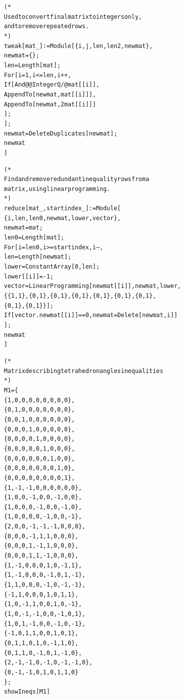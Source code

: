 \documentclass[a4paper, twoside]{article}
\begin{document}
{\begin{alltt}
(* 
  Used to convert final matrix to integers only,
  and to remove repeated rows.
*)
tweak[mat_] := Module[ \{i, j, len, len2, newmat\} , 
  newmat = \{\}; 
  len = Length[mat]; 
  For[i=1, i<=len, i++,
    If[And @@ IntegerQ /@ mat[[i]], 
      AppendTo[newmat, mat[[i]]], 
      AppendTo[newmat, 2 mat[[i]] ]
    ]; 
  ];
  newmat = DeleteDuplicates[newmat]; 
  newmat
]

(*
  Find and remove redundant inequality rows from a 
  matrix, using linear programming.
*)
reduce[mat_, startindex_] := Module[ 
  \{i, len, len0, newmat, lower, vector\}, 
  newmat = mat;
  len0 = Length[mat];   
  For[ i = len0, i >= startindex, i--, 
    len = Length[newmat]; 
    lower = ConstantArray[0, len];
    lower[[i]]= -1;
    vector = LinearProgramming[newmat[[i]], newmat, lower, 
      \{\{1,1\}, \{0,1\}, \{0,1\}, \{0,1\}, \{0,1\}, \{0,1\}, \{0,1\},
      \{0,1\}, \{0,1\}\}];
    If[vector. newmat[[i]] == 0, newmat = Delete[newmat,i]]
  ];
  newmat
]

(* 
  Matrix describing tetrahedron angles inequalities
*)
M1 = \{
  \{  1,  0,  0,  0,  0,  0,  0,  0,  0 \}, 
  \{  0,  1,  0,  0,  0,  0,  0,  0,  0 \}, 
  \{  0,  0,  1,  0,  0,  0,  0,  0,  0 \}, 
  \{  0,  0,  0,  1,  0,  0,  0,  0,  0 \}, 
  \{  0,  0,  0,  0,  1,  0,  0,  0,  0 \}, 
  \{  0,  0,  0,  0,  0,  1,  0,  0,  0 \}, 
  \{  0,  0,  0,  0,  0,  0,  1,  0,  0 \}, 
  \{  0,  0,  0,  0,  0,  0,  0,  1,  0 \}, 
  \{  0,  0,  0,  0,  0,  0,  0,  0,  1 \}, 
  \{  1, -1, -1,  0,  0,  0,  0,  0,  0 \}, 
  \{  1,  0,  0, -1,  0,  0, -1,  0,  0 \}, 
  \{  1,  0,  0,  0, -1,  0,  0, -1,  0 \}, 
  \{  1,  0,  0,  0,  0, -1,  0,  0, -1 \}, 
  \{  2,  0,  0, -1, -1, -1,  0,  0,  0 \}, 
  \{  0,  0,  0, -1,  1,  1,  0,  0,  0 \}, 
  \{  0,  0,  0,  1, -1,  1,  0,  0,  0 \}, 
  \{  0,  0,  0,  1,  1, -1,  0,  0,  0 \}, 
  \{  1, -1,  0,  0,  0,  1,  0, -1,  1 \}, 
  \{  1, -1,  0,  0,  0, -1,  0,  1, -1 \}, 
  \{  1,  1,  0,  0,  0, -1,  0, -1, -1 \}, 
  \{ -1,  1,  0,  0,  0,  1,  0,  1,  1 \}, 
  \{  1,  0, -1,  1,  0,  0,  1,  0, -1 \}, 
  \{  1,  0, -1, -1,  0,  0, -1,  0,  1 \},
  \{  1,  0,  1, -1,  0,  0, -1,  0, -1 \}, 
  \{ -1,  0,  1,  1,  0,  0,  1,  0,  1 \}, 
  \{  0,  1,  1,  0,  1,  0, -1,  1,  0 \}, 
  \{  0,  1,  1,  0, -1,  0,  1, -1,  0 \}, 
  \{  2, -1, -1,  0, -1,  0, -1, -1,  0 \}, 
  \{  0, -1, -1,  0,  1,  0,  1,  1,  0 \}
\} ;
showIneqs[M1] 


\end{alltt}}
\end{document}
